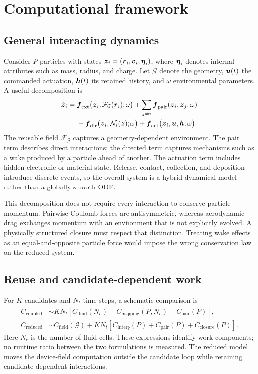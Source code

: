 \section{Computational framework}
\subsection{General interacting dynamics}
Consider $P$ particles with states $\boldsymbol{z}_i=(\boldsymbol{r}_i,\boldsymbol{v}_i,\boldsymbol{\eta}_i)$, where $\boldsymbol{\eta}_i$ denotes internal attributes such as mass, radius, and charge. Let $\mathcal G$ denote the geometry, $\boldsymbol{u}(t)$ the commanded actuation, $\boldsymbol{h}(t)$ its retained history, and $\omega$ environmental parameters. A useful decomposition is
\begin{align}
 \dot{\boldsymbol{z}}_i={}&\boldsymbol{f}_{\mathrm{ext}}\bigl(\boldsymbol{z}_i,
                  \mathcal F_{\mathcal G}(\boldsymbol{r}_i);\omega\bigr)
       +\sum_{j\ne i}\boldsymbol{f}_{\mathrm{pair}}(\boldsymbol{z}_i,\boldsymbol{z}_j;\omega)\\
       &+\boldsymbol{f}_{\mathrm{dir}}\bigl(\boldsymbol{z}_i,\mathcal N_i(\boldsymbol{z});\omega\bigr)
       +\boldsymbol{f}_{\mathrm{act}}\bigl(\boldsymbol{z}_i,\boldsymbol{u},\boldsymbol{h};\omega\bigr).
\label{eq:general_decomposition}
\end{align}
The reusable field $\mathcal F_{\mathcal G}$ captures a geometry-dependent environment. The pair term describes direct interactions; the directed term captures mechanisms such as a wake produced by a particle ahead of another. The actuation term includes hidden electronic or material state. Release, contact, collection, and deposition introduce discrete events, so the overall system is a hybrid dynamical model rather than a globally smooth ODE.

This decomposition does not require every interaction to conserve particle momentum. Pairwise Coulomb forces are antisymmetric, whereas aerodynamic drag exchanges momentum with an environment that is not explicitly evolved. A physically structured closure must respect that distinction. Treating wake effects as an equal-and-opposite particle force would impose the wrong conservation law on the reduced system.

\subsection{Reuse and candidate-dependent work}
For $K$ candidates and $N_t$ time steps, a schematic comparison is
\begin{align}
 C_{\mathrm{coupled}}&\sim K N_t\left[C_{\mathrm{fluid}}(N_c)
                +C_{\mathrm{mapping}}(P,N_c)+C_{\mathrm{pair}}(P)\right],\\
 C_{\mathrm{reduced}}&\sim C_{\mathrm{field}}(\mathcal G)
          +K N_t\left[C_{\mathrm{interp}}(P)+C_{\mathrm{pair}}(P)
                       +C_{\mathrm{closure}}(P)\right].
\label{eq:cost_model}
\end{align}
Here $N_c$ is the number of fluid cells. These expressions identify work components; no runtime ratio between the two formulations is measured. The reduced model moves the device-field computation outside the candidate loop while retaining candidate-dependent interactions.

